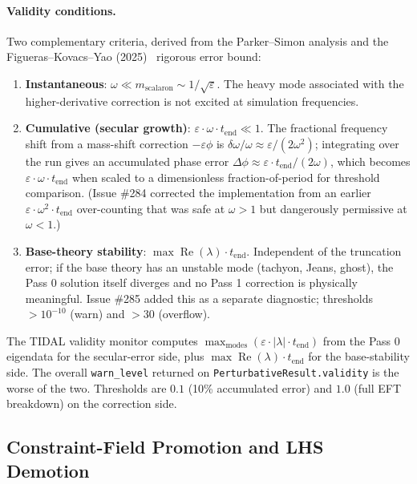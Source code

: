 \paragraph{Validity conditions.} Two complementary criteria, derived from the Parker--Simon analysis and the Figueras--Kovacs--Yao (2025)~\cite{FKY2025} rigorous error bound:
\begin{enumerate}
  \item \textbf{Instantaneous}: $\omega \ll m_{\mathrm{scalaron}} \sim 1/\sqrt{\varepsilon}$. The heavy mode associated with the higher-derivative correction is not excited at simulation frequencies.
  \item \textbf{Cumulative (secular growth)}: $\varepsilon \cdot \omega \cdot t_{\mathrm{end}} \ll 1$. The fractional frequency shift from a mass-shift correction $-\varepsilon \phi$ is $\delta\omega/\omega \approx \varepsilon/(2\omega^2)$; integrating over the run gives an accumulated phase error $\Delta\phi \approx \varepsilon \cdot t_{\mathrm{end}}/(2\omega)$, which becomes $\varepsilon \cdot \omega \cdot t_{\mathrm{end}}$ when scaled to a dimensionless fraction-of-period for threshold comparison. (Issue \#284 corrected the implementation from an earlier $\varepsilon \cdot \omega^2 \cdot t_{\mathrm{end}}$ over-counting that was safe at $\omega > 1$ but dangerously permissive at $\omega < 1$.)
  \item \textbf{Base-theory stability}: $\max \operatorname{Re}(\lambda) \cdot t_{\mathrm{end}}$. Independent of the truncation error; if the base theory has an unstable mode (tachyon, Jeans, ghost), the Pass 0 solution itself diverges and no Pass 1 correction is physically meaningful. Issue \#285 added this as a separate diagnostic; thresholds $>\!10^{-10}$ (warn) and $>\!30$ (overflow).
\end{enumerate}
The TIDAL validity monitor computes $\max_{\mathrm{modes}}(\varepsilon \cdot |\lambda| \cdot t_{\mathrm{end}})$ from the Pass 0 eigendata for the secular-error side, plus $\max \operatorname{Re}(\lambda) \cdot t_{\mathrm{end}}$ for the base-stability side. The overall \texttt{warn\_level} returned on \texttt{PerturbativeResult.validity} is the worse of the two. Thresholds are $0.1$ (10\% accumulated error) and $1.0$ (full EFT breakdown) on the correction side.

\subsection{Constraint-Field Promotion and LHS Demotion}
\label{sec:pr-gap-b}

